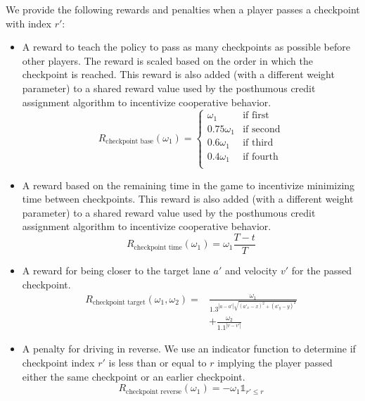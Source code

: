 We provide the following rewards and penalties when a player passes a checkpoint with index $r'$:
\begin{itemize}
    \item A reward to teach the policy to pass as many checkpoints as possible before other players. The reward is scaled based on the order in which the checkpoint is reached. This reward is also added (with a different weight parameter) to a shared reward value used by the posthumous credit assignment algorithm to incentivize cooperative behavior. 
    \begin{equation*}
        R_{\text{checkpoint base}}(\omega_1) = 
        \begin{cases}
            \omega_1 & \text{if first} \\
            0.75\omega_1 & \text{if second} \\
            0.6\omega_1 & \text{if third} \\
            0.4\omega_1 & \text{if fourth} \\
        \end{cases}
    \end{equation*}
    \item A reward based on the remaining time in the game to incentivize minimizing time between checkpoints. This reward is also added (with a different weight parameter) to a shared reward value used by the posthumous credit assignment algorithm to incentivize cooperative behavior. 
    \begin{equation*}
        R_{\text{checkpoint time}}(\omega_1) = \omega_1\frac{T-t}{T}
    \end{equation*}
    \item A reward for being closer to the target lane $a'$ and velocity $v'$ for the passed checkpoint.
    \begin{align*}
        R_{\text{checkpoint target}}(\omega_1, \omega_2) = & \frac{\omega_1}{1.3^{|a-a'|\sqrt{(a'_x-x)^2+(a'_y-y)^2}}} \\
        & + \frac{\omega_2}{1.1^{|v-v'|}}
       \end{align*}
    \item A penalty for driving in reverse. We use an indicator function to determine if checkpoint index $r'$ is less than or equal to $r$ implying the player passed either the same checkpoint or an earlier checkpoint.
    \begin{equation*}
        R_{\text{checkpoint reverse}}(\omega_1) = -\omega_1\mathds{1}_{r' \leq r}
    \end{equation*}
\end{itemize}
